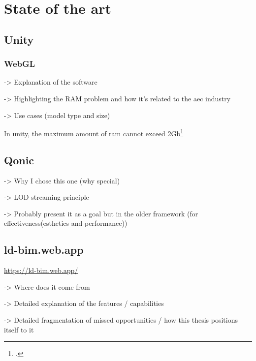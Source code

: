 \chapter{State of the art}
\section{Unity}
\subsection{WebGL}
-> Explanation of the software

-> Highlighting the RAM problem and how it's related to the aec industry

-> Use cases (model type and size)

In unity, the maximum amount of ram cannot exceed 2Gb\footcite{UnityWebGL}

\section{Qonic}
-> Why I chose this one (why special)

-> LOD streaming principle

-> Probably present it as a goal but in the older framework (for effectiveness(esthetics and performance))
\section{ld-bim.web.app}
\url{https://ld-bim.web.app/}

-> Where does it come from

-> Detailed explanation of the features / capabilities

-> Detailed fragmentation of missed opportunities / how this thesis positions itself to it
